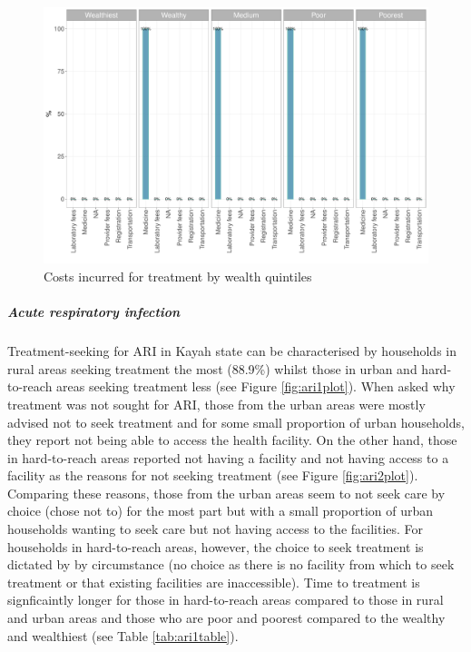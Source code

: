 \documentclass[12pt,a4paper]{article}
\let\oldsubparagraph\subparagraph
\renewcommand{\subparagraph}[1]{\oldsubparagraph{#1}\mbox{}}
\begin{document}
\begin{figure}[H]

{\centering \includegraphics{kayahReport_files/figure-latex/diarrhoea8plot-1} 

}

\caption{Costs incurred for treatment by wealth quintiles}\label{fig:diarrhoea8plot}
\end{figure}

\hypertarget{ari}{%
\subparagraph{Acute respiratory infection}\label{ari}}

Treatment-seeking for ARI in Kayah state can be characterised by households in rural areas seeking treatment the most (88.9\%) whilst those in urban and hard-to-reach areas seeking treatment less (see Figure \ref{fig:ari1plot}). When asked why treatment was not sought for ARI, those from the urban areas were mostly advised not to seek treatment and for some small proportion of urban households, they report not being able to access the health facility. On the other hand, those in hard-to-reach areas reported not having a facility and not having access to a facility as the reasons for not seeking treatment (see Figure \ref{fig:ari2plot}). Comparing these reasons, those from the urban areas seem to not seek care by choice (chose not to) for the most part but with a small proportion of urban households wanting to seek care but not having access to the facilities. For households in hard-to-reach areas, however, the choice to seek treatment is dictated by by circumstance (no choice as there is no facility from which to seek treatment or that existing facilities are inaccessible). Time to treatment is signficaintly longer for those in hard-to-reach areas compared to those in rural and urban areas and those who are poor and poorest compared to the wealthy and wealthiest (see Table \ref{tab:ari1table}).
\end{document}
